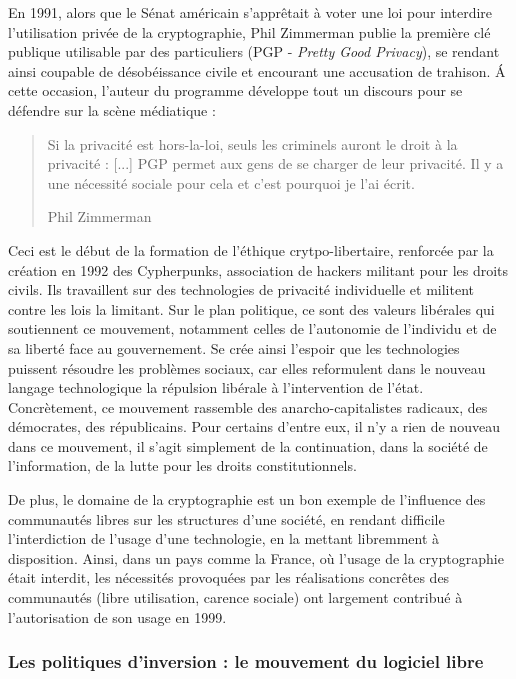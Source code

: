 En 1991, alors que le Sénat américain s'apprêtait à voter une loi pour interdire l'utilisation privée de la cryptographie, Phil Zimmerman publie la première clé publique utilisable par des particuliers (PGP - \emph{Pretty Good Privacy}), se rendant ainsi coupable de désobéissance civile et encourant une accusation de trahison. \'A cette occasion, l'auteur du programme développe tout un discours pour se défendre sur la scène médiatique :

\begin{quote}
Si la privacité est hors-la-loi, seuls les criminels auront le droit à la privacité : [...] PGP permet aux gens de se charger de leur privacité. Il y a une nécessité sociale pour cela et c'est pourquoi je l'ai écrit. 
\begin{flushright}
Phil Zimmerman
\end{flushright}
\end{quote}

Ceci est le début de la formation de l'éthique crytpo-libertaire, renforcée par la création en 1992 des Cypherpunks, association de hackers militant pour les droits civils. Ils travaillent sur des technologies de privacité individuelle et militent contre les lois la limitant. Sur le plan politique, ce sont des valeurs libérales qui soutiennent ce mouvement, notamment celles de l'autonomie de l'individu et de sa liberté face au gouvernement. Se crée ainsi l'espoir que les technologies puissent résoudre les problèmes sociaux, car elles reformulent dans le nouveau langage technologique la répulsion libérale à l'intervention de l'état. Concrètement, ce mouvement rassemble des anarcho-capitalistes radicaux, des démocrates, des républicains. Pour certains d'entre eux, il n'y a rien de nouveau dans ce mouvement, il s'agit simplement de la continuation, dans la société de l'information, de la lutte pour les droits constitutionnels.

De plus, le domaine de la cryptographie est un bon exemple de l'influence des communautés libres sur les structures d'une société, en rendant difficile l'interdiction de l'usage d'une technologie, en la mettant libremment à disposition. Ainsi, dans un pays comme la France, où l'usage de la cryptographie était interdit, les nécessités provoquées par les réalisations concrêtes des communautés (libre utilisation, carence sociale) ont largement contribué à l'autorisation de son usage en 1999.

\subsubsection{Les politiques d'inversion : le mouvement du logiciel libre} \label{2.2.2.c}

